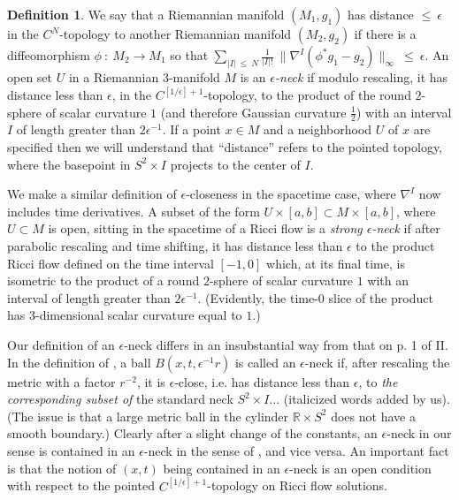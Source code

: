 \documentclass[12pt]{amsart}
\newcommand{\R}{{\mathbb R}}
\newcommand{\eps}{\epsilon}
\numberwithin{equation}{section}
\theoremstyle{plain}
\theoremstyle{definition}
\newtheorem{definition}[equation]{Definition}
\theoremstyle{remark}
\begin{document}
\begin{definition} \label{closenessdef}
We say that a Riemannian manifold
$(M_1, g_1)$ has distance $\le \: \epsilon$ in the $C^N$-topology 
to another Riemannian manifold $(M_2, g_2)$ if
there is a diffeomorphism $\phi \: : \: M_2 \rightarrow M_1$ so
that $\sum_{|I| \: \le \: N} \frac{1}{|I|!} \:
\parallel \nabla^I (\phi^* g_1 - g_2) \parallel_\infty \: \le 
\: \epsilon$.
An open set $U$ in a Riemannian $3$-manifold $M$ is an 
{\em $\eps$-neck}
if modulo rescaling, it has 
distance less than $\eps$,
in the $C^{[1/\epsilon]+1}$-topology, to the product of the 
round $2$-sphere of scalar curvature $1$ (and therefore
Gaussian curvature $\frac12$)
with an interval $I$ of length 
greater than
$2 \eps^{-1}$.
If a point $x \in M$ and a neighborhood $U$ of $x$ are specified then we 
will understand that ``distance''
refers to the pointed topology,
where the basepoint in $S^2 \times I$ projects to the center of $I$.

We make a similar definition of $\epsilon$-closeness in the
spacetime case, where $\nabla^I$ now includes time derivatives.
A subset of the form $U\times [a,b]\subset M\times [a,b]$,
where $U\subset M$ is open, sitting
in the spacetime of a Ricci flow is a {\em strong $\eps$-neck}
if after parabolic rescaling and time shifting, it has distance less
than $\eps$ to the
product Ricci flow defined on the time
interval $[-1,0]$ which,  at its final time,
is isometric to the  product of a  round $2$-sphere of scalar
curvature $1$ 
with an interval of length greater than $2\eps^{-1}$. (Evidently,
the time-$0$ slice of the product has $3$-dimensional scalar curvature
equal to $1$.) 
\end{definition}

Our definition of an $\epsilon$-neck 
differs in an insubstantial way from that on p. 1 of II.
In the definition of \cite{Perelman2}, 
a ball $B(x, t, \epsilon^{-1} r)$ is called
an $\epsilon$-neck if, after rescaling the metric with a factor
$r^{-2}$, it is $\epsilon$-close,
i.e. has distance less than $\epsilon$,
to {\em the corresponding subset of}
the standard neck 
$S^2 \times I$... 
(italicized words added by us). 
(The issue is that a large metric ball in the cylinder $\R \times S^2$
does not have a smooth boundary.)
Clearly after a slight change
of the constants, an $\epsilon$-neck in our sense is contained in an
$\epsilon$-neck in the sense of \cite{Perelman2}, 
and vice versa. An important fact
is that the notion of $(x, t)$ being contained in an $\epsilon$-neck
is an open condition with respect to the pointed $C^{[1/\epsilon]+1}$-topology
on Ricci flow solutions.
\end{document}
